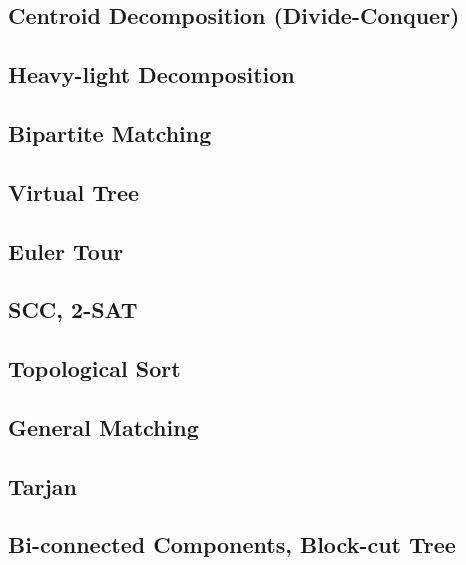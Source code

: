 \subsection{Centroid Decomposition (Divide-Conquer)}
\raggedbottom
\hrulefill
\subsection{Heavy-light Decomposition}
\raggedbottom
\hrulefill
\subsection{Bipartite Matching}
\raggedbottom
\hrulefill
\subsection{Virtual Tree}
\raggedbottom
\hrulefill
\subsection{Euler Tour}
\raggedbottom
\hrulefill
\subsection{SCC, 2-SAT}
\raggedbottom
\hrulefill
\subsection{Topological Sort}
\raggedbottom
\hrulefill
\subsection{General Matching}
\raggedbottom
\hrulefill
\subsection{Tarjan}
\raggedbottom
\hrulefill
\subsection{Bi-connected Components, Block-cut Tree}
\raggedbottom
\hrulefill
